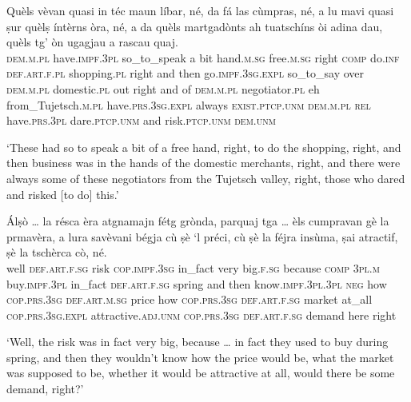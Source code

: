 \begin{linenumbers}
\gll Quèls vèvan quasi in téc maun líbar, né, da fá las cùmpras, né, a lu mavi quasi ṣur quèlṣ íntèrns òra, né, a da quèls martgadònts ah tuatschíns òi adina dau, quèls tg’ òn ugagjau a rascau quaj.\\
  \textsc{dem.m.pl} have.\textsc{impf.3pl} so\_to\_speak a bit hand.\textsc{m.sg} free.\textsc{m.sg} right \textsc{comp} do.\textsc{inf} \textsc{def.art.f.pl} shopping.\textsc{pl} right and then go.\textsc{impf.3sg.expl} so\_to\_say over \textsc{dem.m.pl} domestic.\textsc{pl} out right and of \textsc{dem.m.pl} negotiator.\textsc{pl} eh from\_Tujetsch.\textsc{m.pl} have.\textsc{prs.3sg}.\textsc{expl} always \textsc{exist.ptcp.unm} \textsc{dem.m.pl} \textsc{rel} have.\textsc{prs.3pl} dare.\textsc{ptcp.unm} and risk.\textsc{ptcp.unm} \textsc{dem.unm}\\
\end{linenumbers}
\medskip
\glt `These had so to speak a bit of a free hand, right, to do the shopping, right, and then business was in the hands of the domestic merchants, right, and there were always some of these negotiators from the Tujetsch valley, right, those who dared and risked [to do] this.'
\medskip

 \begin{linenumbers}
\gll Álṣò … la résca èra atgnamajn fétg grònda, parquaj tga … èls cumpravan gè la prmavèra, a lura savèvani bégja cù ṣè `l préci, cù ṣè la féjra insùma, ṣai atractif, ṣè la tschèrca cò, né.\\
well {} \textsc{def.art.f.sg} risk \textsc{cop.impf.3sg} in\_fact very big.\textsc{f.sg} because \textsc{comp} {} \textsc{3pl.m} buy.\textsc{impf.3pl} in\_fact \textsc{def.art.f.sg} spring and then know.\textsc{impf.3pl.3pl} \textsc{neg} how \textsc{cop.prs.3sg} \textsc{def.art.m.sg} price how \textsc{cop.prs.3sg} \textsc{def.art.f.sg} market at\_all \textsc{cop.prs.3sg.expl} attractive.\textsc{adj.unm} \textsc{cop.prs.3sg} \textsc{def.art.f.sg} demand here right \\
\end{linenumbers}
\medskip
\glt `Well, the risk was in fact very big, because … in fact they used to buy during spring, and then they wouldn’t know how the price would be, what the market was supposed to be, whether it would be attractive at all, would there be some demand, right?'
\medskip

